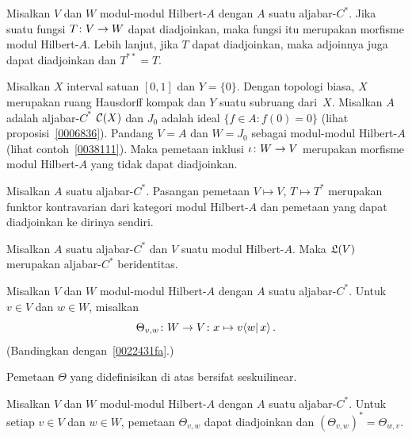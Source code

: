 \begin{prop} Misalkan $V$ dan $W$ modul-modul Hilbert-$A$ dengan $A$ suatu aljabar-$C^*$. Jika suatu
fungsi $T\colon V \rightarrow W$ dapat diadjoinkan, maka fungsi itu merupakan morfisme modul Hilbert-$A$.
Lebih lanjut, jika $T$ dapat diadjoinkan, maka adjoinnya juga dapat diadjoinkan dan $T^{**} = T$.
\end{prop}

\begin{exam} Misalkan $X$ interval satuan $[0,1]$ dan $Y = \{0\}$. Dengan topologi biasa,
$X$ merupakan ruang Hausdorff kompak dan $Y$ suatu subruang dari~$X$. Misalkan $A$ adalah
aljabar-$C^*$ $\mathcal{C}(X)$ dan $J_0$ adalah ideal $\{f \in A\colon f(0) = 0\}$ (lihat
proposisi~\ref{0006836}). Pandang $V = A$ dan $W = J_0$ sebagai modul-modul Hilbert-$A$ (lihat
contoh~\ref{0038111}). Maka pemetaan inklusi
$\iota\colon W \rightarrow V$ merupakan morfisme modul Hilbert-$A$ yang tidak dapat diadjoinkan.
\end{exam}

\begin{prop} Misalkan $A$ suatu aljabar-$C^*$. Pasangan pemetaan $V \mapsto V$, $T \mapsto T^*$
merupakan funktor kontravarian dari kategori modul Hilbert-$A$ dan pemetaan yang dapat diadjoinkan
ke dirinya sendiri.
\end{prop}

\begin{prop}\label{0038244} Misalkan $A$ suatu aljabar-$C^*$ dan $V$ suatu modul Hilbert-$A$.
Maka $\mathfrak{L}(V)$ merupakan aljabar-$C^*$ beridentitas.
\end{prop}

\begin{notn} Misalkan $V$ dan $W$ modul-modul Hilbert-$A$ dengan $A$ suatu aljabar-$C^*$.
Untuk $v \in V$ dan $w \in W$, misalkan
  \[ \Theta_{v,w}\colon W \rightarrow V\colon x \mapsto v\langle w \vert\, x\rangle\,. \]
(Bandingkan dengan~\ref{0022431fa}.)
\end{notn}

\begin{prop} Pemetaan $\Theta$ yang didefinisikan di atas bersifat seskuilinear.
\end{prop}

\begin{prop} Misalkan $V$ dan $W$ modul-modul Hilbert-$A$ dengan $A$ suatu aljabar-$C^*$. Untuk
setiap $v \in V$ dan $w \in W$, pemetaan $\Theta_{v,w}$ dapat diadjoinkan dan $(\Theta_{v,w})^*
= \Theta_{w,v}$.
\end{prop}

